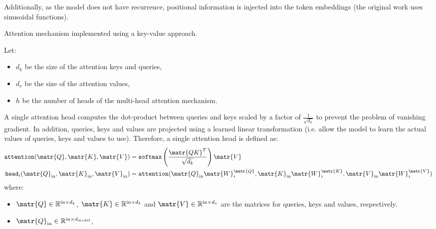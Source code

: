 \begin{description}
\begin{description}
                Additionally, as the model does not have recurrence, positional information is injected into the token embeddings (the original work uses sinusoidal functions).

            \item[Multi-head attention] 
                Attention mechanism implemented using a key-value approach.

                Let:
                \begin{itemize}
                    \item $d_k$ be the size of the attention keys and queries,
                    \item $d_v$ be the size of the attention values,
                    \item $h$ be the number of heads of the multi-head attention mechanism.
                \end{itemize} 
                A single attention head computes the dot-product between queries and keys scaled by a factor of $\frac{1}{\sqrt{d_k}}$ to prevent the problem of vanishing gradient.
                In addition, queries, keys and values are projected using a learned linear transformation 
                (i.e. allow the model to learn the actual values of queries, keys and values to use).
                Therefore, a single attention head is defined as:
                \[
                    \begin{split}
                        \texttt{attention}(\matr{Q}, \matr{K}, \matr{V}) &= \texttt{softmax} \left( \frac{\matr{QK}^T}{\sqrt{d_k}} \right)\matr{V} \\
                        \texttt{head}_{i}(\matr{Q}_\text{in}, \matr{K}_\text{in}, \matr{V}_\text{in}) &= 
                            \texttt{attention}(\matr{Q}_\text{in}\matr{W}_{i}^\matr{Q}, \matr{K}_\text{in}\matr{W}_{i}^\matr{K}, \matr{V}_\text{in}\matr{W}_{i}^\matr{V})
                    \end{split}
                \]
                where:
                \begin{itemize}
                    \item $\matr{Q} \in \mathbb{R}^{\text{in} \times d_k}$, 
                        $\matr{K} \in \mathbb{R}^{\text{in} \times d_k}$ and 
                        $\matr{V} \in \mathbb{R}^{\text{in} \times d_v}$ are the matrices for queries, keys and values, respectively.
                    \item $\matr{Q}_\text{in} \in \mathbb{R}^{\text{in} \times d_{\text{model}}}$, 

\end{itemize}
\end{description}
\end{description}
